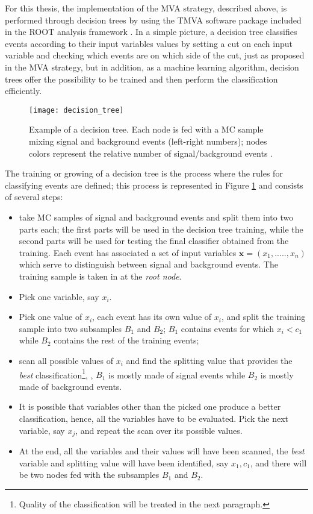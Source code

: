 For this thesis, the implementation of the MVA strategy, described above, is performed through decision trees by using the TMVA software package \cite{tmva} included in the ROOT analysis framework \cite{root}. In a simple picture, a decision tree classifies events according to their input variables values by setting a cut on each input variable and checking which events are on which side of the cut, just as proposed in the MVA strategy, but in addition, as a machine learning algorithm, decision trees offer the possibility to be trained and then perform the classification efficiently.   

\begin{figure}[!h]
  \centering
  \texttt{[image: decision\_tree]}
  \caption[Decision tree.]{Example of a decision tree. Each node is fed with a MC sample mixing signal and background events (left-right numbers); nodes colors represent the relative number of signal/background events \cite{luca}.}\label{fig:dt}
\end{figure}

The training or growing of a decision tree is the process where the rules for classifying events are defined; this process is represented in Figure \ref{fig:dt} and consists of several steps:

\begin{itemize}
\item take MC samples of signal and background events and split them into two parts each; the first parts will be used in the decision tree training, while the second parts will be used for testing the final classifier obtained from the training. Each event has associated a set of input variables $\textbf{x}=(x_1,.....,x_n)$ which serve to distinguish between signal and background events. The training sample is taken in at the \textit{root node}. 
\item Pick one variable, say $x_i$.
\item Pick one value of $x_i$, each event has its own value of $x_i$, and split the training sample into two subsamples $B_1$ and $B_2$; $B_1$ contains events for which $x_i< c_1$ while $B_2$ contains the rest of the training events;
\item scan all possible values of $x_i$ and find the splitting value that provides the \textit{best} classification\footnote{ Quality of the classification will be treated in the next paragraph.}, \ie, $B_1$ is mostly made of signal events while $B_2$ is mostly made of background events.
\item It is possible that variables other than the picked one produce a better classification, hence, all the variables have to be evaluated. Pick the next variable, say $x_j$, and repeat the scan over its possible values.
\item At the end, all the variables and their values will have been scanned, the \textit{best} variable and splitting value will have been identified, say $x_1, c_1$, and there will be two nodes fed with the subsamples $B_1$ and $B_2$. 
\end{itemize}

